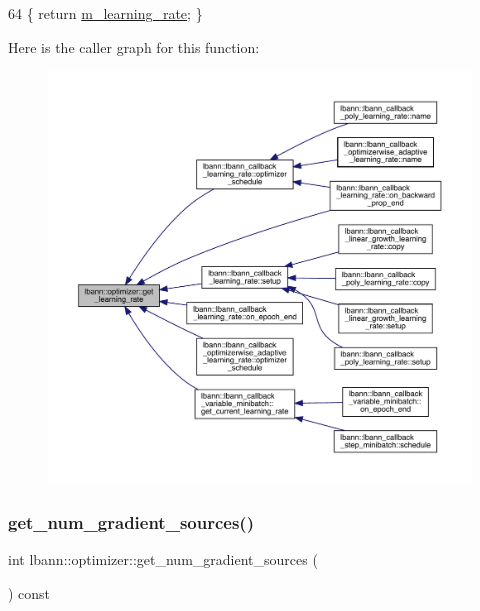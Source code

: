 \begin{DoxyCode}
64 \{ \textcolor{keywordflow}{return} \hyperlink{classlbann_1_1optimizer_ad393dcdcb82b44510c586ed5ec46d4dd}{m\_learning\_rate}; \}
\end{DoxyCode}
Here is the caller graph for this function\+:\nopagebreak
\begin{figure}[H]
\begin{center}
\leavevmode
\includegraphics[width=350pt]{classlbann_1_1optimizer_ac52867427b0d28ec6888b6344104791d_icgraph}
\end{center}
\end{figure}
\mbox{\label{classlbann_1_1optimizer_a91370e4de6083e7cd464c809cf583eb3}} 
\subsubsection{\texorpdfstring{get\+\_\+num\+\_\+gradient\+\_\+sources()}{get\_num\_gradient\_sources()}}
{\footnotesize\ttfamily int lbann\+::optimizer\+::get\+\_\+num\+\_\+gradient\+\_\+sources (\begin{DoxyParamCaption}{ }\end{DoxyParamCaption}) const\hspace{0.3cm}{\ttfamily [inline]}}

